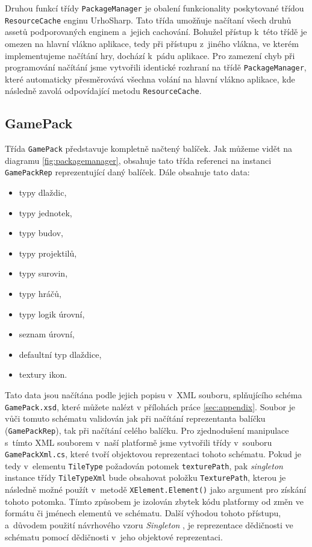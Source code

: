 Druhou funkcí třídy \texttt{PackageManager} je obalení funkcionality poskytované třídou \texttt{ResourceCache} enginu UrhoSharp. Tato třída umožňuje načítaní všech druhů assetů podporovaných enginem a~jejich cachování. Bohužel přístup k~této třídě je omezen na hlavní vlákno aplikace, tedy při přístupu z~jiného vlákna, ve kterém implementujeme načítání hry, dochází k~pádu aplikace. Pro zamezení chyb při programování načítání jsme vytvořili identické rozhraní na třídě \texttt{PackageManager}, které automaticky přesměrovává všechna volání na hlavní vlákno aplikace, kde následně zavolá odpovídající metodu \texttt{ResourceCache}.


\subsection{GamePack}
\label{sec:gamepack}


Třída \texttt{GamePack} představuje kompletně načtený balíček. Jak můžeme vidět na diagramu \ref{fig:packagemanager}, obsahuje tato třída referenci na instanci \texttt{GamePackRep} reprezentující daný balíček. Dále obsahuje tato data:

\begin{itemize}
	\item typy dlaždic,
	\item typy jednotek,
	\item typy budov,
	\item typy projektilů,
	\item typy surovin,
	\item typy hráčů,
	\item typy logik úrovní,
	\item seznam úrovní,
	\item defaultní typ dlaždice,
	\item textury ikon.
\end{itemize}

Tato data jsou načítána podle jejich popisu v~XML souboru, splňujícího schéma \texttt{GamePack.xsd}, které můžete nalézt v přílohách práce \ref{sec:appendix}. Soubor je vůči tomuto schématu validován jak při načítání reprezentanta balíčku (\texttt{GamePackRep}), tak při načítání celého balíčku. Pro zjednodušení manipulace s~tímto XML souborem v~naší platformě jsme vytvořili třídy v~souboru \texttt{GamePackXml.cs}, které tvoří objektovou reprezentaci tohoto schématu. Pokud je tedy v~elementu \texttt{TileType} požadován potomek \texttt{texturePath}, pak \textit{singleton} instance třídy \texttt{TileTypeXml} bude obsahovat položku \texttt{TexturePath}, kterou je následně možné použít v~metodě \texttt{XElement.Element()} jako argument pro získání tohoto potomka. Tímto způsobem je izolován zbytek kódu platformy od změn ve formátu či jménech elementů ve schématu. Další výhodou tohoto přístupu, a~důvodem použití návrhového vzoru \textit{Singleton} \citep[str.~127]{book:gangoffour}, je reprezentace dědičnosti ve schématu pomocí dědičnosti v~jeho objektové reprezentaci.


